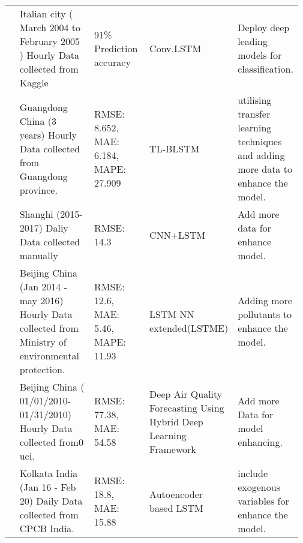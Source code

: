 \begin{landscape}
{\begin{longtable}[h!]{ p{0.04\linewidth} p{0.33\linewidth} p{0.22\linewidth} p{0.17\linewidth} p{0.21\linewidth} }
\cite{zhu2023deep}           & Italian city ( March 2004 to   February 2005 ) Hourly Data collected from Kaggle & 91\% Prediction accuracy & Conv.LSTM                                                           & Deploy deep leading models for classification.  \\
 \cite{ma2019improving}               & Guangdong China (3 years) Hourly   Data collected from Guangdong province.                               & RMSE: 8.652,  MAE: 6.184,    MAPE: 27.909                                                                   & TL-BLSTM                                                            & utilising transfer learning techniques and adding more data to enhance the model.     \\
\cite{qin2019novel}       & Shanghi (2015-2017) Daliy Data collected   manually  & RMSE:  14.3   & CNN+LSTM     &  Add more data for enhance model. \\
 \cite{li2017long}          & Beijing China (Jan 2014 -may   2016) Hourly Data collected from Ministry of environmental protection.    & RMSE: 12.6,  MAE: 5.46,  MAPE:  11.93                                                                        & LSTM NN extended(LSTME)                                             & Adding more pollutants to enhance the model.                                           \\
 \cite{du2019deep}         & Beijing China (   01/01/2010-01/31/2010) Hourly Data collected from0 uci.                                 & RMSE: 77.38,  MAE: 54.58                                                                                   & Deep Air Quality Forecasting   Using Hybrid Deep Learning Framework & Add more Data for model enhancing.\\
\cite{nath2021long}       & Kolkata India (Jan 16 - Feb 20)  Daily Data collected from CPCB   India.                               & RMSE: 18.8,  MAE: 15.88                                                                                    & Autoencoder based LSTM                                             &  include exogenous variables for enhance the model. \\ \hline
  \end{longtable}}
  \end{landscape}

